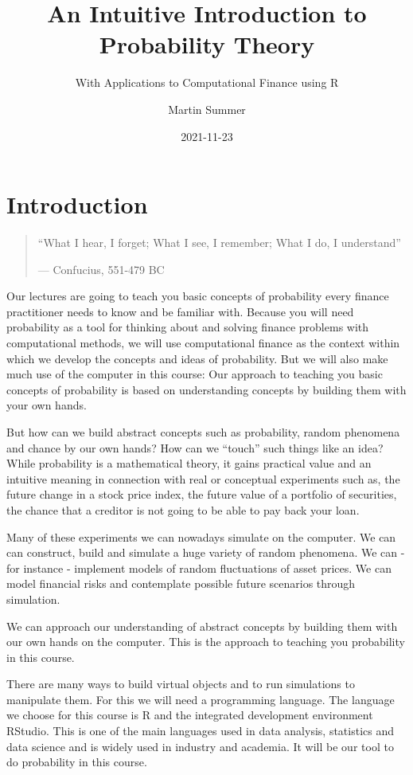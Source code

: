 \documentclass[
]{book}
\title{An Intuitive Introduction to Probability Theory}
\subtitle{With Applications to Computational Finance using R}
\author{Martin Summer}
\date{2021-11-23}
\begin{document}
\maketitle

{
\setcounter{tocdepth}{1}
\tableofcontents
}
\hypertarget{introduction}{%
\chapter{Introduction}\label{introduction}}

\begin{quote}
``What I hear, I forget; What I see, I remember; What I do, I understand''

\hfill --- Confucius, 551-479 BC
\end{quote}

Our lectures are going to teach you basic concepts of probability every finance
practitioner needs to know and be familiar with. Because you will need
probability as a tool for thinking about and solving finance problems with
computational methods, we will use computational finance as the context within
which we develop the concepts and ideas of probability. But we will also
make much use of the computer in this course: Our approach to teaching you
basic concepts of probability is based on understanding concepts by building
them with your own hands.

But how can we build abstract concepts such as probability, random phenomena and chance by
our own hands? How can we ``touch'' such things like an idea?
While probability is a mathematical theory, it gains practical value and an intuitive meaning in
connection with real or conceptual experiments such as, the future change in a stock price
index, the future value of a portfolio of securities, the chance that a creditor is not going
to be able to pay back your loan.

Many of these experiments we can nowadays simulate on the computer. We
can can construct, build and simulate a huge variety of random phenomena. We can - for instance -
implement models of random fluctuations of asset prices. We can model financial risks
and contemplate possible future scenarios through simulation.

We can approach our understanding of abstract concepts
by building them with our own hands on the computer. This is the approach to teaching you
probability in this course.

There are many ways to build virtual objects and to run simulations to manipulate
them. For this we will need a programming language. The language we choose for this
course is R and the integrated development environment RStudio. This is one of the main
languages used in data analysis, statistics and data science and is widely used in industry and
academia. It will be our tool to do probability in this course.
\end{document}
